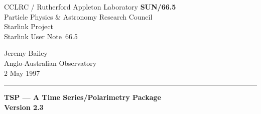 \newenvironment{mandescription}{\begin{description}\begin{description}}%
{\end{description}\end{description}}

\newcommand{\mandescriptionitem}[1]{\item[#1]\mbox{}}


\newcommand{\mantt}{\tt}


\def\@mansemiverbatim{\trivlist\item[]\if@minipage\else\vskip\parskip\fi%
\leftskip\@totalleftmargin\rightskip\z@%
\parindent\z@\parfillskip\@flushglue\parskip\z@%
\@tempswafalse\def\par{\if@tempswa\hbox{}\fi\@tempswatrue\@@par}%
\obeylines}

\def\mansemiverbatim{\@mansemiverbatim\frenchspacing\@vobeyspaces}

\let\endmansemiverbatim=\endtrivlist


\makeatother

\newcommand{\stardoccategory}  {Starlink User Note}
\newcommand{\stardocinitials}  {SUN}
\newcommand{\stardocnumber}    {66.5}
\newcommand{\stardocname}      {\stardocinitials/\stardocnumber}
\newcommand{\stardocauthors}   {Jeremy Bailey\\
                                Anglo-Australian Observatory}
\newcommand{\stardocdate}      {2 May 1997}
\newcommand{\stardoctitle}     {TSP --- A Time Series/Polarimetry Package
                                \\[2ex] Version 2.3}

\setlength{\textwidth}{160mm}
\setlength{\textheight}{230mm}
\setlength{\topmargin}{-5mm}
\setlength{\oddsidemargin}{0mm}
\setlength{\evensidemargin}{0mm}
\setlength{\parindent}{0mm}
\setlength{\parskip}{\medskipamount}

\renewcommand{\thepage}{\roman{page}}

\thispagestyle{empty}
CCLRC / {\sc Rutherford Appleton Laboratory} \hfill {\bf \stardocname}\\
{\large Particle Physics \& Astronomy Research Council}\\
{\large Starlink Project\\}
{\large \stardoccategory\ \stardocnumber}
\begin{flushright}
\stardocauthors\\
\stardocdate
\end{flushright}
\vspace{-4mm}
\rule{\textwidth}{0.5mm}
\vspace{5mm}
\begin{center}
{\Large\bf \stardoctitle}
\end{center}
\vspace{5mm}

